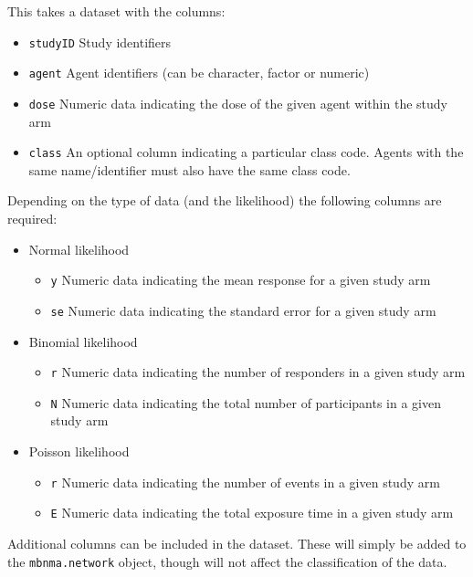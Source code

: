 \documentclass[]{article}
\providecommand{\tightlist}{%
  \setlength{\itemsep}{0pt}\setlength{\parskip}{0pt}}
\begin{document}
This takes a dataset with the columns:

\begin{itemize}
\tightlist
\item
  \texttt{studyID} Study identifiers
\item
  \texttt{agent} Agent identifiers (can be character, factor or numeric)
\item
  \texttt{dose} Numeric data indicating the dose of the given agent
  within the study arm
\item
  \texttt{class} An optional column indicating a particular class code.
  Agents with the same name/identifier must also have the same class
  code.
\end{itemize}

Depending on the type of data (and the likelihood) the following columns
are required:

\begin{itemize}
\tightlist
\item
  Normal likelihood

  \begin{itemize}
  \tightlist
  \item
    \texttt{y} Numeric data indicating the mean response for a given
    study arm
  \item
    \texttt{se} Numeric data indicating the standard error for a given
    study arm
  \end{itemize}
\item
  Binomial likelihood

  \begin{itemize}
  \tightlist
  \item
    \texttt{r} Numeric data indicating the number of responders in a
    given study arm
  \item
    \texttt{N} Numeric data indicating the total number of participants
    in a given study arm
  \end{itemize}
\item
  Poisson likelihood

  \begin{itemize}
  \tightlist
  \item
    \texttt{r} Numeric data indicating the number of events in a given
    study arm
  \item
    \texttt{E} Numeric data indicating the total exposure time in a
    given study arm
  \end{itemize}
\end{itemize}

Additional columns can be included in the dataset. These will simply be
added to the \texttt{mbnma.network} object, though will not affect the
classification of the data.
\end{document}
